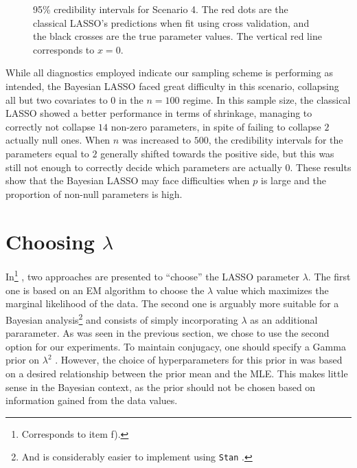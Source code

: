 \documentclass[a4paper, 10pt]{article}
\begin{document}
\begin{figure}[htb]
\begin{center}
\begin{minipage}{.47\textwidth}
        \end{minipage}
    \end{center}
    \caption[95\% credibility intervals for Scenario 4.]{95\% credibility intervals for Scenario 4. The red dots are the classical LASSO's predictions when fit using cross validation, and the black crosses are the true parameter values. The vertical red line corresponds to $ x = 0 $.}
    \label{fig: credibility intervals scenario 4}
\end{figure}
While all diagnostics employed indicate our sampling scheme is performing as intended, the Bayesian LASSO faced great difficulty in this scenario, collapsing all but two covariates to $ 0 $ in the $ n = 100 $ regime.
In this sample size, the classical LASSO showed a better performance in terms of shrinkage, managing to correctly not collapse $ 14 $ non-zero parameters, in spite of failing to collapse $ 2 $ actually null ones.
When $ n $ was increased to $ 500 $, the credibility intervals for the parameters equal to $ 2 $ generally shifted towards the positive side, but this was still not enough to correctly decide which parameters are actually $ 0 $.
These results show that the Bayesian LASSO may face difficulties when $ p $ is large and the proportion of non-null parameters is high.





\section{Choosing $\lambda$}
\label{sec: diabetes data experiment}

In\footnote{Corresponds to item f).} \cite{parkcasella2008bayesianlasso}, two approaches are presented to ``choose'' the LASSO parameter $ \lambda $.
The first one is based on an EM algorithm to choose the $ \lambda $ value which maximizes the marginal likelihood of the data.
The second one is arguably more suitable for a Bayesian analysis\footnote{And is considerably easier to implement using \texttt{Stan} .} and consists of simply incorporating $ \lambda $ as an additional pararameter.
As was seen in the previous section, we chose to use the second option for our experiments.
To maintain conjugacy, one should specify a Gamma prior on $ \lambda^2 $ \cite{parkcasella2008bayesianlasso}.
However, the choice of hyperparameters for this prior in \cite{parkcasella2008bayesianlasso} was based on a desired relationship between the prior mean and the MLE.
This makes little sense in the Bayesian context, as the prior should not be chosen based on information gained from the data values.
\end{document}

